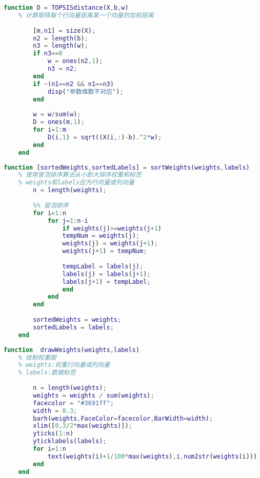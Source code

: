 \documentclass[withoutpreface]{cumcmthesis}
\begin{document}
    \begin{lstlisting}[language=matlab,caption={TOPSISdistance.m}]
    function D = TOPSISdistance(X,b,w)
    % 计算矩阵每个行向量距离某一个向量的加权距离
    
        [m,n1] = size(X);
        n2 = length(b);
        n3 = length(w);
        if n3==0
            w = ones(n2,1);
            n3 = n2;
        end
        if ~(n1==n2 && n1==n3)
            disp("参数维数不对应");
        end
        
        w = w/sum(w);
        D = ones(m,1);
        for i=1:m
            D(i,1) = sqrt((X(i,:)-b).^2*w);
        end
    end
    \end{lstlisting}

    \begin{lstlisting}[language=matlab,caption={sortWeights.m}]
    function [sortedWeights,sortedLabels] = sortWeights(weights,labels)
    % 使用冒泡排序算法从小到大排序权重和标签
    % weights和labels应为行向量或列向量
        n = length(weights);
        
        %% 冒泡排序
        for i=1:n
            for j=1:n-i
                if weights(j)>=weights(j+1)
                tempNum = weights(j);
                weights(j) = weights(j+1);
                weights(j+1) = tempNum;
        
                tempLabel = labels(j);
                labels(j) = labels(j+1);
                labels(j+1) = tempLabel;
                end
            end
        end
        
        sortedWeights = weights;
        sortedLabels = labels;
    end        
    \end{lstlisting}

    \begin{lstlisting}[language=matlab,caption={drawWeights.m}]
    function  drawWeights(weights,labels)
    % 绘制权重图
    % weights:权重行向量或列向量
    % labels:数据标签
    
        n = length(weights);
        weights = weights / sum(weights);
        facecolor = "#3691ff";
        width = 0.3;
        barh(weights,FaceColor=facecolor,BarWidth=width);
        xlim([0,3/2*max(weights)]);
        yticks(1:n)
        yticklabels(labels);
        for i=1:n
            text(weights(i)+1/100*max(weights),i,num2str(weights(i)))
        end
    end  
    \end{lstlisting}
    
\end{document}
